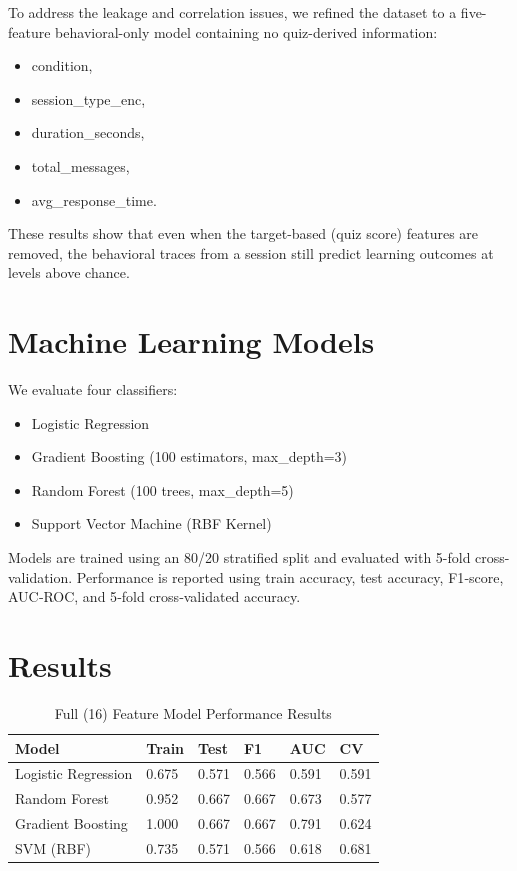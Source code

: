 \documentclass[conference]{IEEEtran}
\begin{document}
To address the leakage and correlation issues, we refined the dataset to a five-feature behavioral-only model containing no quiz-derived information:

\begin{itemize}[noitemsep]
    \item condition,
    \item session\_type\_enc,
    \item duration\_seconds,
    \item total\_messages,
    \item avg\_response\_time.
\end{itemize}

These results show that even when the target-based (quiz score) features are removed, the behavioral traces from a session still predict learning outcomes at levels above chance.


\section{Machine Learning Models}
We evaluate four classifiers:

\begin{itemize}
    \item Logistic Regression
    \item Gradient Boosting (100 estimators, max\_depth=3)
    \item Random Forest (100 trees, max\_depth=5)
    \item Support Vector Machine (RBF Kernel)
\end{itemize}

Models are trained using an 80/20 stratified split and evaluated with 5-fold cross-validation. Performance is reported using train accuracy, test accuracy, F1‑score, AUC‑ROC, and 5‑fold cross‑validated accuracy.

\section{Results}

\begin{table}[H]
\centering
\caption{Full (16) Feature Model Performance Results}
\begin{tabular}{|p{2.2cm}|p{1cm}|p{1cm}|p{1cm}|p{1cm}|p{.8cm}|}
\hline
\textbf{Model} & \textbf{Train} & \textbf{Test} & \textbf{F1} & \textbf{AUC} & \textbf{CV}\\
\hline
Logistic Regression  & 0.675 & 0.571  & 0.566  & 0.591 & 0.591 \\
\hline
Random Forest & 0.952 & 0.667  & 0.667 & 0.673 &  0.577 \\
\hline
Gradient Boosting & 1.000 & 0.667  & 0.667 & 0.791 &  0.624 \\
\hline
SVM (RBF) & 0.735 & 0.571  & 0.566 & 0.618 &  0.681 \\
\hline
\end{tabular}
\label{tab:16-performance-chart}
\end{table}
\end{document}
